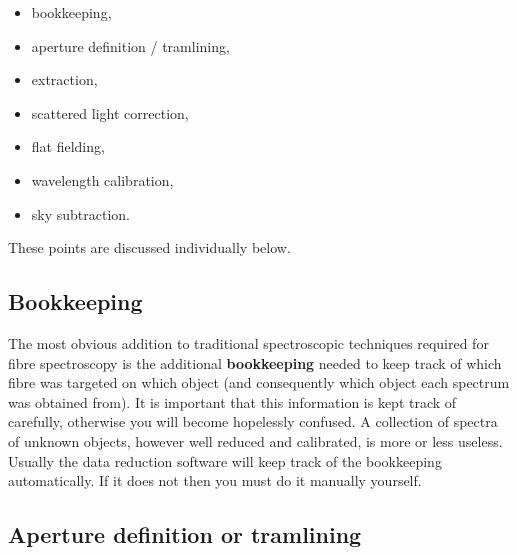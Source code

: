 \documentclass[chapters,twoside,11pt]{starlink}
\begin{document}
\begin{itemize}

  \item bookkeeping,

  \item aperture definition / tramlining,

  \item extraction,

  \item scattered light correction,

  \item flat fielding,

  \item wavelength calibration,

  \item sky subtraction.

\end{itemize}

These points are discussed individually below.

\subsection{Bookkeeping}

The most obvious addition to traditional spectroscopic techniques
required for fibre spectroscopy is the additional \textbf{bookkeeping}
needed to keep track of which fibre was targeted on which object (and
consequently which object each spectrum was obtained from).  It is
important that this information is kept track of carefully, otherwise
you will become hopelessly confused.  A collection of spectra of
unknown objects, however well reduced and calibrated, is more or less
useless.  Usually the data reduction software will keep track of the
bookkeeping automatically.  If it does not then you must do it manually
yourself.

\subsection{Aperture definition or tramlining}
\end{document}
